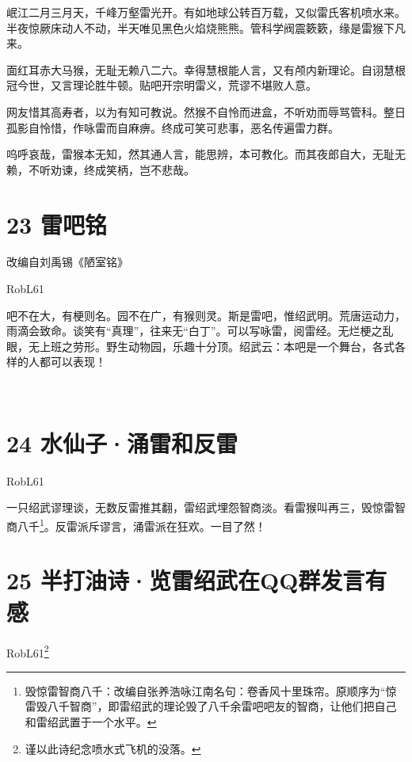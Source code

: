 \documentclass[UTF8,12pt,oneside]{ctexbook}
\begin{document}
        岷江二月三月天，千峰万壑雷光开。有如地球公转百万载，又似雷氏客机喷水来。半夜惊厥床动人不动，半天唯见黑色火焰烧熊熊。管科学阀震簌簌，缘是雷猴下凡来。
        
        面红耳赤大马猴，无耻无赖八二六。幸得慧根能人言，又有颅内新理论。自诩慧根冠今世，又言理论胜牛顿。贴吧开宗明雷义，荒谬不堪败人意。
        
        网友惜其高寿者，以为有知可教说。然猴不自怜而进盒，不听劝而辱骂管科。整日孤影自怜惜，作咏雷而自麻痹。终成可笑可悲事，恶名传遍雷力群。
        
        呜呼哀哉，雷猴本无知，然其通人言，能思辨，本可教化。而其夜郎自大，无耻无赖，不听劝谏，终成笑柄，岂不悲哉。
        
    \section{23 雷吧铭}
        \begin{center}
        \Large \kaishu
        改编自刘禹锡《陋室铭》
        \songti \large
        
        RobL61
        \end{center}
        
        吧不在大，有梗则名。园不在广，有猴则灵。斯是雷吧，惟绍武明。荒唐运动力，雨滴会致命。谈笑有“真理”，往来无“白丁”。可以写咏雷，阅雷经。无烂梗之乱眼，无上班之劳形。野生动物园，乐趣十分顶。绍武云：本吧是一个舞台，各式各样的人都可以表现！
        
        ~\\
        
    \section{24 水仙子·涌雷和反雷}
        \begin{center}
        RobL61
        \end{center}
        
        一只绍武谬理谈，无数反雷推其翻，雷绍武埋怨智商淡。看雷猴叫再三，毁惊雷智商八千\footnote{毁惊雷智商八千：改编自张养浩咏江南名句：卷香风十里珠帘。原顺序为“惊雷毁八千智商”，即雷绍武的理论毁了八千余雷吧吧友的智商，让他们把自己和雷绍武置于一个水平。}。反雷派斥谬言，涌雷派在狂欢。一目了然！

    \newpage
        
    \section{25 半打油诗·览雷绍武在QQ群发言有感}
        \begin{center}
        RobL61\footnote{谨以此诗纪念喷水式飞机的没落。}
        \end{center}
        
\end{document}
